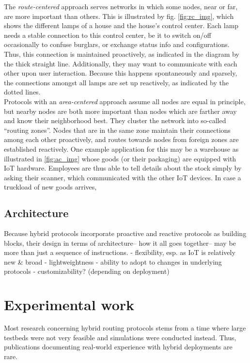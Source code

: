 \documentclass[a4paper,10pt]{scrartcl}
\begin{document}
The \emph{route-centered} approach serves networks in which some nodes, near or far, are more important than others. This is illustrated by fig. \ref{fig:rc_img}, which shows the different lamps of a house and the house's control center. Each lamp needs a stable connection to this control center, be it to switch on/off occasionally to confuse burglars, or exchange status info and configurations. Thus, this connection is maintained proactively, as indicated in the diagram by the thick straight line. Additionally, they may want to communicate with each other upon user interaction. Because this happens spontaneously and sparsely, the connections amongst all lamps are set up reactively, as indicated by the dotted lines.\\
Protocols with an \emph{area-centered} approach assume all nodes are equal in principle, but nearby nodes are both more important than nodes which are farther away and know their neighborhood best. They cluster the network into so-called ``routing zones''. Nodes that are in the same zone maintain their connections among each other proactively, and routes towards nodes from foreign zones are established reactively. 
One example application for this may be a warehouse as illustrated in \ref{fig:ac_img} whose goods (or their packaging) are equipped with IoT hardware. Employees are thus able to tell details about the stock simply by asking their scanner, which communicated with the other IoT devices. In case a truckload of new goods arrives, 

\subsection{Architecture}
\label{subsec:architecture}
Because hybrid protocols incorporate proactive and reactive protocols as building blocks, their design in terms of architecture-- how it all goes together-- may be more than just a sequence of instructions.
- flexibility, esp. as IoT is relatively new \& broad
- lightweightness
- ability to adopt to changes in underlying protocols
- customizability? (depending on deployment)

\section{Experimental work}
\label{sec:experiments}
Most research concerning hybrid routing protocols stems from a time where large testbeds were not very feasible and simulations were conducted instead.  Thus, publications documenting real-world experience with hybrid deployments are rare.\\
\end{document}
